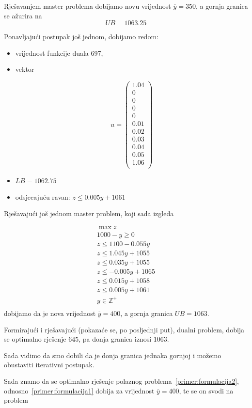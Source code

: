 \documentclass[a4paper, utf8, 11pt, colorlinks]{book}
\begin{document}
 Rješavanjem master problema dobijamo novu vrijednost $\overline{y} =350$, a gornja granica se ažurira na 
 $$UB = 1063.25$$
 
 Ponavljajući postupak još jednom, dobijamo redom: 
 \begin{itemize}
 	\item 
 vrijednost funkcije duala 697,
 \item vektor
 
  $$u=\left(\begin{array}{c}
 	1.04\\
 	0\\
 	0\\
 	0\\
 	0\\
 	0.01\\
 	0.02\\
 	0.03\\
 	0.04\\
 	0.05\\
 	1.06\\
 \end{array}\right)$$
\item $LB = 1062.75$
\item odsjecajuću ravan:  $z\leqslant 0.005y+1061$
\end{itemize}


Rješavajući još jednom master problem, koji sada izgleda

  $$
\begin{aligned}
	\max z\\
	1000-y\geqslant 0\\
	z\leqslant 1100-0.055y\\ 
	z\leqslant 1.045y+1055\\
	z\leqslant 0.035y+1055\\
	z\leqslant -0.005y+1065\\
	z\leqslant 0.015y+1058\\
	z\leqslant 0.005y+1061\\
	y\in\mathbb{Z}^+\\	
\end{aligned}
$$
dobijamo da je nova vrijednost $\overline{y}=400$, a gornja granica $UB = 1063$.

Formirajući i rješavajući (pokazaće se, po posljednji put), dualni problem, dobija se optimalno rješenje 645, pa donja granica iznosi 1063.

Sada vidimo da smo dobili da je donja granica jednaka gornjoj i možemo obustaviti iterativni postupak.

Sada znamo da se optimalno rješenje polaznog problema~\ref{primer:formulacija2}, odnosno~\ref{primer:formulacija1} dobija za vrijednost $\overline{y}=400$, te se on svodi na problem
\end{document}
